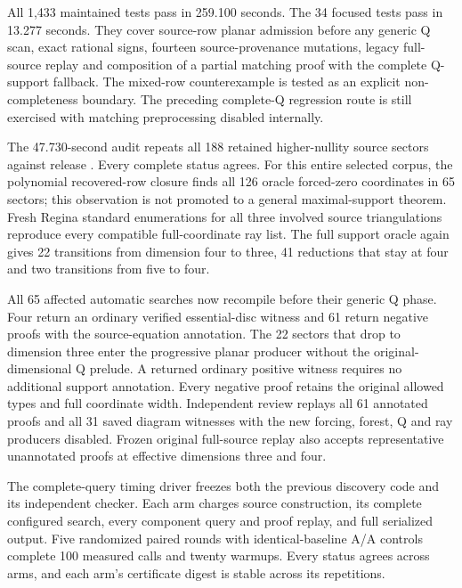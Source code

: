 All 1,433 maintained tests pass in 259.100 seconds. The 34 focused tests
pass in 13.277 seconds. They cover source-row planar admission before any
generic Q scan, exact rational signs, fourteen source-provenance mutations,
legacy full-source replay and composition of a partial matching proof with
the complete Q-support fallback. The mixed-row counterexample is tested as
an explicit non-completeness boundary. The preceding complete-Q regression
route is still exercised with matching preprocessing disabled internally.

The 47.730-second audit repeats all 188 retained higher-nullity source
sectors against release . Every complete status agrees.
For this entire selected corpus, the polynomial recovered-row closure finds
all 126 oracle forced-zero coordinates in 65 sectors; this observation is
not promoted to a general maximal-support theorem. Fresh Regina standard
enumerations for all three involved source triangulations reproduce every
compatible full-coordinate ray list. The full support oracle again gives
22 transitions from dimension four to three, 41 reductions that stay at
four and two transitions from five to four.

All 65 affected automatic searches now recompile before their generic Q
phase. Four return an ordinary verified essential-disc witness and 61
return negative proofs with the source-equation annotation. The 22 sectors
that drop to dimension three enter the progressive planar producer without
the original-dimensional Q prelude. A returned ordinary positive witness
requires no additional support annotation. Every negative proof retains
the original allowed types and full coordinate width. Independent review
replays all 61 annotated proofs and all 31 saved diagram witnesses with the
new forcing, forest, Q and ray producers disabled. Frozen original
full-source replay also accepts representative unannotated proofs at
effective dimensions three and four.

The complete-query timing driver freezes both the previous discovery code
and its independent checker. Each arm charges source construction, its
complete configured search, every component query and proof replay, and
full serialized output. Five randomized paired rounds with identical-baseline
A/A controls complete 100 measured calls and twenty warmups. Every status
agrees across arms, and each arm's certificate digest is stable across
its repetitions.



